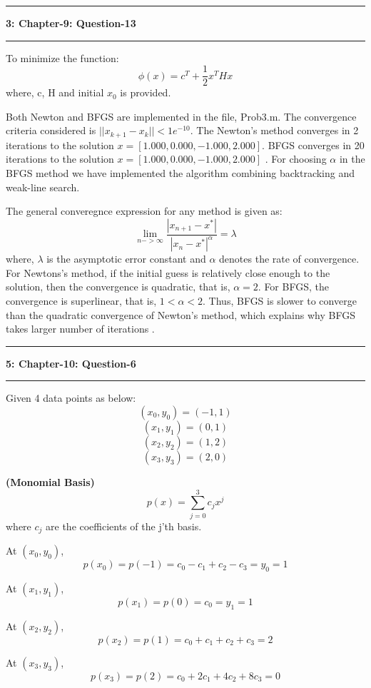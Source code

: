 \documentclass{article}
\newcommand\question[2]{\vspace{.25in}\hrule\textbf{#1: #2}\hrule\vspace{.10in}}
\renewcommand\part[1]{\vspace{.10in}\textbf{(#1)}}
\begin{document}
\question{3}{Chapter-9: Question-13}
To minimize the function:
\[ \phi(x) = c^T + \dfrac{1}{2}x^THx \]
where, c, H and initial $x_0$ is provided. \newline

Both Newton and BFGS are implemented in the file, Prob3.m. The convergence criteria considered is $||x_{k+1} - x_k|| < 1e^{-10}$. The Newton's method converges in 2 iterations to the solution $x = [1.000, 0.000, -1.000, 2.000]$. BFGS converges in 20 iterations to the solution $x = [1.000, 0.000, -1.000, 2.000]$ . For choosing $\alpha$ in the BFGS method we have implemented the algorithm combining backtracking and weak-line search.

The general converegnce expression for any method is given as:
\[ \lim_{n->\infty} \dfrac{|x_{n+1} - x^*|}{|x_n - x^*|^\alpha} = \lambda \]
where, $\lambda$ is the asymptotic error constant and $\alpha$ denotes the rate of convergence. For Newtons's method, if the initial guess is relatively close enough to the solution, then the convergence is quadratic, that is, $\alpha=2$. For BFGS, the convergence is superlinear, that is, $1 < \alpha < 2$. Thus, BFGS is slower to converge than the quadratic convergence of Newton's method, which explains why BFGS takes larger number of iterations . \newline



\question{5}{Chapter-10: Question-6}
Given 4 data points as below:
\[(x_0,y_0) = (-1,1)\]
\[(x_1,y_1) = (0,1)\]
\[(x_2,y_2) = (1,2)\]
\[(x_3,y_3) = (2,0)\]

\part{Monomial Basis} 
\[ p(x) = \sum_{j=0}^3 c_jx^j\]
where $c_j$ are the coefficients of the j'th basis. \newline

At $(x_0, y_0)$, 
\[p(x_0) = p(-1) = c_0 - c_1 + c_2 - c_3 = y_0 = 1\]

At $(x_1, y_1)$,
\[p(x_1) = p(0) = c_0 = y_1 = 1\]

At $(x_2, y_2)$,
\[ p(x_2) = p(1) = c_0 + c_1 + c_2 + c_3 = 2 \]

At $(x_3, y_3)$,
\[ p(x_3) = p(2) = c_0 + 2c_1 + 4c_2 + 8c_3 = 0\]
\end{document}
